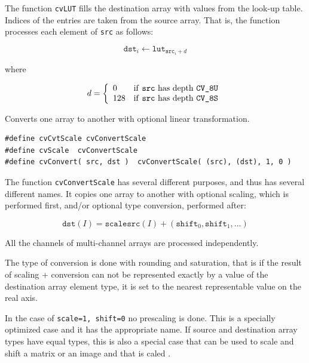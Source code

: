 The function \texttt{cvLUT} fills the destination array with values from the look-up table. Indices of the entries are taken from the source array. That is, the function processes each element of \texttt{src} as follows:

\[
\texttt{dst}_i \leftarrow \texttt{lut}_{\texttt{src}_i + d}
\]

where

\[
d = \left\{ \begin{array}{l l} 0 & \mbox{if \texttt{src} has depth \texttt{CV\_8U}}\\ 128 & \mbox{if \texttt{src} has depth \texttt{CV\_8S}}\\ \end{array} \right.
\]

\label{ConvertScale}

Converts one array to another with optional linear transformation.


\begin{lstlisting}
#define cvCvtScale cvConvertScale
#define cvScale  cvConvertScale
#define cvConvert( src, dst )  cvConvertScale( (src), (dst), 1, 0 )
\end{lstlisting}

\begin{description}
\end{description}


The function \texttt{cvConvertScale} has several different purposes, and thus has several different names. It copies one array to another with optional scaling, which is performed first, and/or optional type conversion, performed after:

\[
\texttt{dst}(I) = \texttt{scale} \texttt{src}(I) + (\texttt{shift}_0,\texttt{shift}_1,...)
\]

All the channels of multi-channel arrays are processed independently.

The type of conversion is done with rounding and saturation, that is if the
result of scaling + conversion can not be represented exactly by a value
of the destination array element type, it is set to the nearest representable
value on the real axis.

In the case of \texttt{scale=1, shift=0} no prescaling is done. This is a specially
optimized case and it has the appropriate  name. If
source and destination array types have equal types, this is also a
special case that can be used to scale and shift a matrix or an image
and that is caled .

